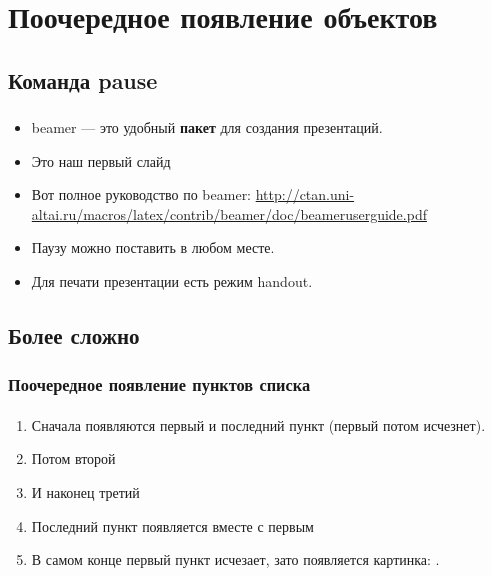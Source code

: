 \documentclass[t]{beamer}  %
\title{}
\subtitle{}
\author{Стоян А.С}
\date{\today}
\institute[]{}
\begin{document}
\frame[plain]{\titlepage}	%

\frame[plain]{\titlepage}	%

\section{Поочередное появление объектов}
\subsection{Команда pause}

\begin{frame}
\frametitle{\insertsection} 
\framesubtitle{\insertsubsection}
\begin{itemize}
    \item beamer ---  это \alert{удобный} \textbf{пакет} для создания презентаций.
    \item Это наш первый слайд \pause
    \item Вот полное руководство по beamer:  \href{http://ctan.uni-altai.ru/macros/latex/contrib/beamer/doc/beameruserguide.pdf}{http://ctan.uni-altai.ru/macros/latex/contrib/beamer/doc/beameruserguide.pdf} \pause
    \item Паузу можно поставить в любом \pause месте.
    \item Для печати презентации есть режим handout.
\end{itemize}
\end{frame}

\subsection{Более сложно}

\begin{frame}
\frametitle{Поочередное появление пунктов списка}
\framesubtitle{\insertsubsection}
\begin{enumerate}
\item<1-5> Сначала появляются первый и последний пункт (первый потом исчезнет).
\item<2-> Потом второй
\item<3-> И наконец третий
\item<1-> Последний пункт появляется вместе с первым
\item<6-> В самом конце первый пункт исчезает, зато появляется картинка: \insertlogo.
\end{enumerate}
\end{frame}
\end{document}
